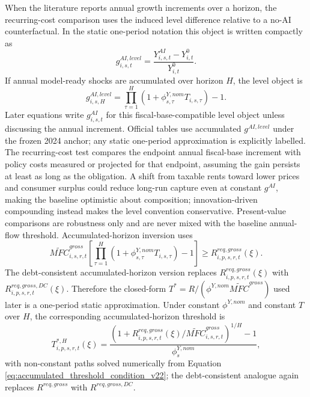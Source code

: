 \documentclass[11pt,a4paper]{article}
\begin{document}
When the literature reports annual growth increments over a horizon, the recurring-cost comparison uses the induced level difference relative to a no-AI counterfactual. In the static one-period notation this object is written compactly as
\begin{equation}
    g^{AI,level}_{i,s,t}=\frac{Y^{AI}_{i,s,t}-Y^{0}_{i,t}}{Y^{0}_{i,t}}.
\end{equation}
If annual model-ready shocks are accumulated over horizon $H$, the level object is
\begin{equation}
    g^{AI,level}_{i,s,H}=\prod_{\tau=1}^{H}\left(1+\phi^{Y,nom}_{s,\tau}T_{i,s,\tau}\right)-1.
\end{equation}
Later equations write $g^{AI}_{i,s,t}$ for this fiscal-base-compatible level object unless discussing the annual increment. Official tables use accumulated $g^{AI,level}$ under the frozen 2024 anchor; any static one-period approximation is explicitly labelled. The recurring-cost test compares the endpoint annual fiscal-base increment with policy costs measured or projected for that endpoint, assuming the gain persists at least as long as the obligation. A shift from taxable rents toward lower prices and consumer surplus could reduce long-run capture even at constant $g^{AI}$, making the baseline optimistic about composition; innovation-driven compounding instead makes the level convention conservative. Present-value comparisons are robustness only and are never mixed with the baseline annual-flow threshold. Accumulated-horizon inversion uses
\begin{equation}\label{eq:accumulated_threshold_condition_v22}
    \widetilde{MFC}^{gross}_{i,s,r,t}\left[\prod_{\tau=1}^{H}\left(1+\phi^{Y,nom}_{s,\tau}T_{i,s,\tau}\right)-1\right]
    \geq R^{req,gross}_{i,p,s,r,t}(\xi).
\end{equation}
The debt-consistent accumulated-horizon version replaces $R^{req,gross}_{i,p,s,r,t}(\xi)$ with $R^{req,gross,DC}_{i,p,s,r,t}(\xi)$. Therefore the closed-form $T^*=R/(\phi^{Y,nom}\widetilde{MFC}^{gross})$ used later is a one-period static approximation. Under constant $\phi^{Y,nom}$ and constant $T$ over $H$, the corresponding accumulated-horizon threshold is
\begin{equation}\label{eq:Tstar_accumulated_constant_v22}
    T^{*,H}_{i,p,s,r,t}(\xi)=
    \frac{\left(1+R^{req,gross}_{i,p,s,r,t}(\xi)/\widetilde{MFC}^{gross}_{i,s,r,t}\right)^{1/H}-1}{\phi^{Y,nom}_{s}},
\end{equation}
with non-constant paths solved numerically from Equation \eqref{eq:accumulated_threshold_condition_v22}; the debt-consistent analogue again replaces $R^{req,gross}$ with $R^{req,gross,DC}$.
\end{document}
